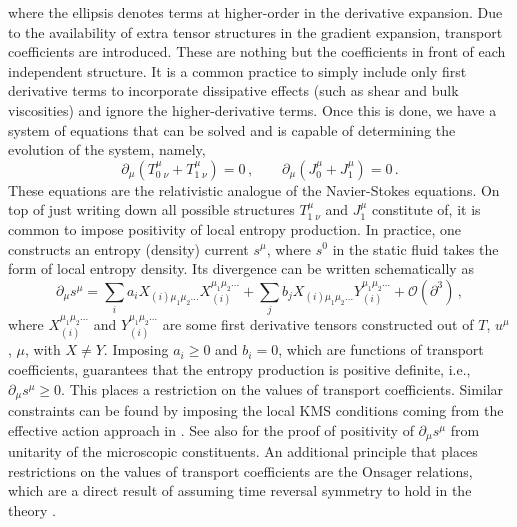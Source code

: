 \documentclass[superscriptaddress,prd,nofootinbib,preprintnumbers,longbibliography,11pt,eqsecnum]{revtex4-1}
\def\d{\partial}
\def\CO{\mathcal{O}}
\begin{document}
where the ellipsis denotes terms at higher-order in the derivative expansion. Due to the availability of extra tensor structures in the gradient expansion, transport coefficients are introduced. These are nothing but the coefficients in front of each independent structure. It is a common practice to simply include only first derivative terms to incorporate dissipative effects (such as shear and bulk viscosities) and ignore the higher-derivative terms. Once this is done, we have a system of equations that can be solved and is capable of determining the evolution of the system, namely,
\begin{equation}
  \d_\mu \left( T^{\mu}_{0\;\nu} + T^{\mu}_{1\;\nu} \right) = 0\, ,\qquad \d_\mu \left(J^\mu_0 + J^\mu_1  \right) = 0\, . \label{eq:1stOrderHydro-schematic}
\end{equation}
These equations are the relativistic analogue of the Navier-Stokes equations. On top of just writing down all possible structures $T^{\mu}_{1\;\nu}$ and $J^{\mu}_1$ constitute of, it is common to impose positivity of local entropy production. In practice, one constructs an entropy (density) current $s^\mu $, where $s^0$ in the static fluid  takes the form of local entropy density. Its divergence can be written schematically as 
\begin{equation}
  \partial_{\mu} s^\mu = \sum_i a_i X_{(i)\mu_1 \mu_2...}X^{\mu_1 \mu_2...}_{(i)} + \sum_j b_j X_{(i)\mu_1 \mu_2...}Y^{\mu_1 \mu_2...}_{(i)}+\CO(\d^3)\, , \label{eq:entropyProd}
\end{equation}
where $X^{\mu_1 \mu_2...}_{(i)}$ and $Y^{\mu_1 \mu_2...}_{(i)}$ are some first derivative tensors constructed out of $T$, $u^\mu$, $\mu$, with $X\neq Y$. Imposing $a_i \ge 0$ and $b_i =0$, which are functions of transport coefficients, guarantees that the entropy production is positive definite, i.e., $\partial_{\mu}s^{\mu}\geq0$. This places a restriction on the values of transport coefficients. Similar constraints can be found by imposing the local KMS conditions coming from the effective action approach in \cite{Crossley:2015evo}. See also \cite{Glorioso:2016gsa} for the proof of positivity of $\d_\mu s^\mu$ from unitarity of the microscopic constituents.
An additional principle that places restrictions on the values of transport coefficients are the Onsager relations, which are a direct result of assuming time reversal symmetry to hold in the theory \cite{Onsager:1931}.
\end{document}
